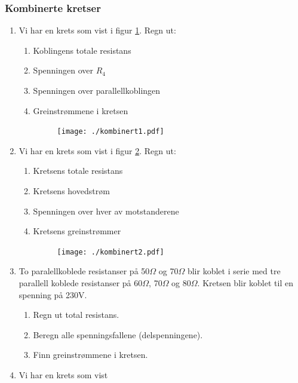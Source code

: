 \documentclass[12pt,a4paper]{article}
\begin{document}
\subsubsection{Kombinerte kretser}
\begin{enumerate}
\item Vi har en krets som vist i figur \ref{fig:-22}. Regn ut:\\

\begin{enumerate}
\item Koblingens totale resistans
\item Spenningen over $R_{4}$
\item Spenningen over parallellkoblingen
\item Greinstrømmene i kretsen\\
\begin{figure}[H]
\noindent \begin{centering}
\texttt{[image: ./kombinert1.pdf]}
\par\end{centering}
\caption{\label{fig:-22}}
\end{figure}
\end{enumerate}
\item Vi har en krets som vist i figur \ref{fig:-2}. Regn ut:

\begin{enumerate}
\item Kretsens totale resistans
\item Kretsens hovedstrøm
\item Spenningen over hver av motstanderene
\item Kretsens greinstrømmer\\
\begin{figure}[H]
\noindent \begin{centering}
\texttt{[image: ./kombinert2.pdf]}
\par\end{centering}
\caption{\label{fig:-2}}
\end{figure}
\end{enumerate}
\item To paralellkoblede resistanser på 50$\Omega$ og 70$\Omega$ blir
koblet i serie med tre parallell koblede resistanser på 60$\Omega$,
70$\Omega$ og 80$\Omega$. Kretsen blir koblet til en spenning på
230V. 

\begin{enumerate}
\item Regn ut total resistans.
\item Beregn alle spenningsfallene (delspenningene). 
\item Finn greinstrømmene i kretsen. 
\end{enumerate}
\item Vi har en krets som vist


\end{enumerate}
\end{document}
